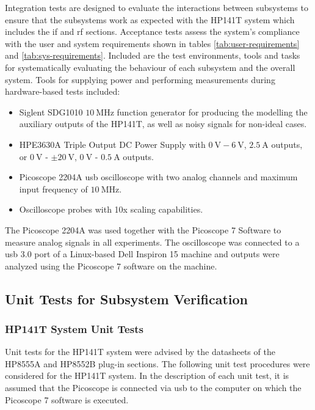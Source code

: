 \documentclass[class=report,11pt,crop=false]{standalone}
\begin{document}
	Integration tests are designed to evaluate the interactions between subsystems to ensure that the subsystems work as expected with the HP141T system which includes the \acrshort{if} and \acrshort{rf} sections. Acceptance tests assess the system's compliance with the user and system requirements shown in tables \ref{tab:user-requirements} and \ref{tab:sys-requirements}. Included are the test environments, tools and tasks for systematically evaluating the behaviour of each subsystem and the overall system. Tools for supplying power and performing measurements during hardware-based tests included:
	\begin{itemize}
		\item 
		Siglent SDG1010 $\SI{10}{\mega\hertz}$ function generator for producing the modelling the auxiliary outputs of the HP141T, as well as noisy signals for non-ideal cases.
		\item 
		HPE3630A Triple Output DC Power Supply with $\SI{0}{\volt}-\SI{6}{\volt}$, $\SI{2.5}{\ampere}$ outputs, or $\SI{0}{\volt}$ - $\pm\SI{20}{\volt}$, $\SI{0}{\volt}$ - $\SI{0.5}{\ampere}$ outputs.
		\item 
		Picoscope 2204A \acrshort{usb} oscilloscope with two analog channels and maximum input frequency of $\SI{10}{\mega\hertz}$.
		\item 
		Oscilloscope probes with 10x scaling capabilities.
	\end{itemize}
	The Picoscope 2204A was used together with the Picoscope 7 Software to measure analog signals in all experiments. The oscilloscope was connected to a \acrshort{usb} 3.0 port of a Linux-based Dell Inspiron 15 machine and outputs were analyzed using the Picoscope 7 software on the machine. 
	\subsection{Unit Tests for Subsystem Verification}
	\subsubsection{HP141T System Unit Tests}
	Unit tests for the HP141T system were advised by the datasheets of the HP8555A and HP8552B plug-in sections. The following unit test procedures were considered for the HP141T system. In the description of each unit test, it is assumed that the Picoscope is connected via \acrshort{usb} to the computer on which the Picoscope 7 software is executed.
	
\end{document}
